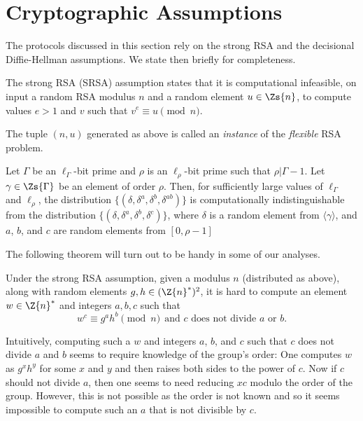 \section{Cryptographic Assumptions}
\label{Cryptographic Assumptions and Handy Facts}

The protocols discussed in this section
rely on the strong RSA and the decisional Diffie-Hellman assumptions. 
We state then briefly for completeness.

\begin{assumption}
The strong RSA (SRSA) assumption states that it is computational infeasible, 
on input a random RSA modulus
$n$ and a random element $u \in \Zs{n}$, to compute values $e > 1$ and $v$
such that $v^e \equiv u \pmod{n}$.  
\end{assumption}

The tuple $(n,u)$ generated as above is called an \emph{instance} of
the \emph{flexible} RSA problem.

\begin{assumption}
Let $\Gamma$ be an $\ell_\Gamma$-bit prime and $\rho$ is an $\ell_\rho$-bit prime 
such that $\rho | \Gamma-1$. 
Let $\gamma \in \Zs{\Gamma}$ be an element of order $\rho$.
Then, for sufficiently large values of $\ell_\Gamma$ and $\ell_\rho$, 
the distribution $\{(\delta, \delta^a, \delta^b, \delta^{ab}) \}$ 
is computationally indistinguishable from the
distribution $\{ (\delta, \delta^a, \delta^b, \delta^{c}) \}$, 
where $\delta$ is a random element from $\langle \gamma \rangle$,
and $a$, $b$, and $c$ are random elements from $[0,\rho-1]$ 
\end{assumption}


The following theorem will turn out to be handy in some of our analyses. 
\begin{theorem}\cite{camsho03}
\label{thm:strong-rsa}
Under the strong RSA assumption, given a modulus $n$
(distributed as above), along with random elements $g, h \in (\Z{n}^*)^2$,
it is hard to compute an element $w \in \Z{n}^*$ and integers $a, b, c$
such that
\begin{equation}
\label{eqn:strong-rsa}
w^c \equiv g^a h^b \pmod{n} \ \ \mbox{and  $c$ does not divide $a$ or $b$}.
\end{equation}
\end{theorem}
Intuitively, computing such a $w$ and  integers $a$, $b$, and $c$ such that
$c$ does not divide $a$ and $b$ seems to require knowledge of the group's order:
One computes $w$ as $g^xh^y$ for some $x$ and $y$ and then raises both sides
to the power of $c$. 
Now if $c$ should not divide $a$, then one seems to need reducing $xc$ modulo the order
of the group.
However, this is not possible as the order is not known and so it seems 
impossible to compute such an $a$ that is not divisible by $c$.


